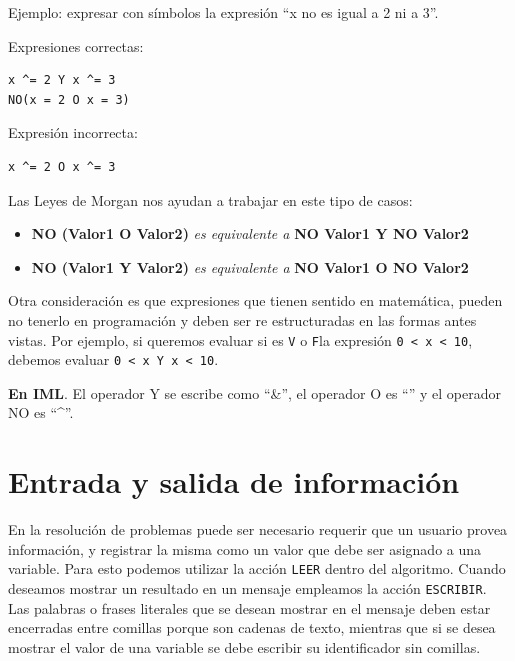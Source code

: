 \documentclass[]{book}
\providecommand{\tightlist}{%
  \setlength{\itemsep}{0pt}\setlength{\parskip}{0pt}}
\begin{document}
Ejemplo: expresar con símbolos la expresión ``x no es igual a 2 ni a 3''.

Expresiones correctas:

\begin{verbatim}
x ^= 2 Y x ^= 3
NO(x = 2 O x = 3)
\end{verbatim}

Expresión incorrecta:

\begin{verbatim}
x ^= 2 O x ^= 3
\end{verbatim}

Las Leyes de Morgan nos ayudan a trabajar en este tipo de casos:

\begin{itemize}
\tightlist
\item
  \textbf{NO (Valor1 O Valor2)} \emph{es equivalente a} \textbf{NO Valor1 Y NO Valor2}
\item
  \textbf{NO (Valor1 Y Valor2)} \emph{es equivalente a} \textbf{NO Valor1 O NO Valor2}
\end{itemize}

Otra consideración es que expresiones que tienen sentido en matemática, pueden no tenerlo en programación y deben ser re estructuradas en las formas antes vistas. Por ejemplo, si queremos evaluar si es \texttt{V} o \texttt{F}la expresión \texttt{0\ \textless{}\ x\ \textless{}\ 10}, debemos evaluar \texttt{0\ \textless{}\ x\ Y\ x\ \textless{}\ 10}.

\textbf{En IML}. El operador Y se escribe como ``\&'', el operador O es ``\textbar{}'' y el operador NO es ``\^{}''.

\hypertarget{entrada-y-salida-de-informacion}{%
\section{Entrada y salida de información}\label{entrada-y-salida-de-informacion}}

En la resolución de problemas puede ser necesario requerir que un usuario provea información, y registrar la misma como un valor que debe ser asignado a una variable. Para esto podemos utilizar la acción \texttt{LEER} dentro del algoritmo. Cuando deseamos mostrar un resultado en un mensaje empleamos la acción \texttt{ESCRIBIR}. Las palabras o frases literales que se desean mostrar en el mensaje deben estar encerradas entre comillas porque son cadenas de texto, mientras que si se desea mostrar el valor de una variable se debe escribir su identificador sin comillas.
\end{document}
